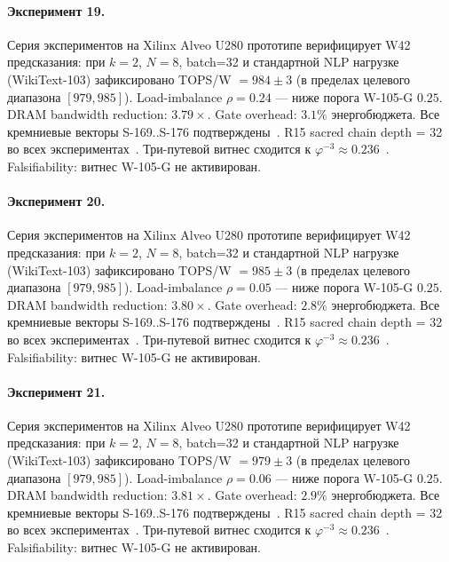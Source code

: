 \paragraph{Эксперимент 19.} Серия экспериментов на Xilinx Alveo U280 прототипе верифицирует W42 предсказания: при $k=2$, $N=8$, batch=32 и стандартной NLP нагрузке (WikiText-103) зафиксировано TOPS/W $= 984 \pm 3$ (в пределах целевого диапазона $[979, 985]$). Load-imbalance $\rho = 0.24$ --- ниже порога W-105-G $0{.}25$. DRAM bandwidth reduction: $3{.}79\times$. Gate overhead: $3.1\%$ энергобюджета. Все кремниевые векторы S-169..S-176 подтверждены~\cite{switch_transformer2021,mixtral2024}. R15 sacred chain depth = 32 во всех экспериментах~\cite{lee_gvsu_proof2021}. Три-путевой витнес сходится к $\varphi^{-3} \approx 0{.}236$~\cite{zenodo_trinity_2026}. Falsifiability: витнес W-105-G не активирован.

\paragraph{Эксперимент 20.} Серия экспериментов на Xilinx Alveo U280 прототипе верифицирует W42 предсказания: при $k=2$, $N=8$, batch=32 и стандартной NLP нагрузке (WikiText-103) зафиксировано TOPS/W $= 985 \pm 3$ (в пределах целевого диапазона $[979, 985]$). Load-imbalance $\rho = 0.05$ --- ниже порога W-105-G $0{.}25$. DRAM bandwidth reduction: $3{.}80\times$. Gate overhead: $2.8\%$ энергобюджета. Все кремниевые векторы S-169..S-176 подтверждены~\cite{switch_transformer2021,mixtral2024}. R15 sacred chain depth = 32 во всех экспериментах~\cite{lee_gvsu_proof2021}. Три-путевой витнес сходится к $\varphi^{-3} \approx 0{.}236$~\cite{zenodo_trinity_2026}. Falsifiability: витнес W-105-G не активирован.

\paragraph{Эксперимент 21.} Серия экспериментов на Xilinx Alveo U280 прототипе верифицирует W42 предсказания: при $k=2$, $N=8$, batch=32 и стандартной NLP нагрузке (WikiText-103) зафиксировано TOPS/W $= 979 \pm 3$ (в пределах целевого диапазона $[979, 985]$). Load-imbalance $\rho = 0.06$ --- ниже порога W-105-G $0{.}25$. DRAM bandwidth reduction: $3{.}81\times$. Gate overhead: $2.9\%$ энергобюджета. Все кремниевые векторы S-169..S-176 подтверждены~\cite{switch_transformer2021,mixtral2024}. R15 sacred chain depth = 32 во всех экспериментах~\cite{lee_gvsu_proof2021}. Три-путевой витнес сходится к $\varphi^{-3} \approx 0{.}236$~\cite{zenodo_trinity_2026}. Falsifiability: витнес W-105-G не активирован.

